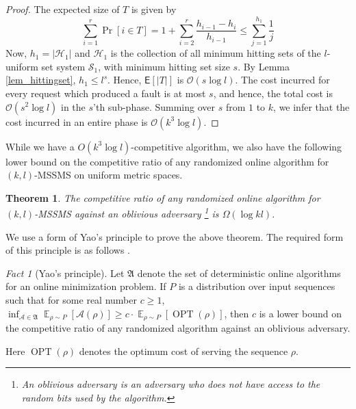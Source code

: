 \documentclass[11pt]{article}
\theoremstyle{plain}\newtheorem{theorem}{Theorem}
\theoremstyle{definition}
\theoremstyle{remark}
\newtheorem{fact}{Fact}
\DeclareMathOperator{\opt}{OPT}
\begin{document}
\begin{proof}
The expected size of $T$ is given by
\[\sum_{i=1}^r\Pr[i\in T]=1+\sum_{i=2}^r\frac{h_{i-1}-h_i}{h_{i-1}}\leq\sum_{j=1}^{h_1}\frac{1}{j}\]
Now, $h_1=|\mathcal{H}_1|$ and $\mathcal{H}_1$ is the collection of all minimum hitting sets of the $l$-uniform set system $\mathcal{S}_1$, with minimum hitting set size $s$. By Lemma \ref{lem_hittingset}, $h_1\leq l^s$. Hence, $\mathsf{E}[|T|]$ is $\mathcal{O}(s\log l)$. The cost incurred for every request which produced a fault is at most $s$, and hence, the total cost is $\mathcal{O}(s^2\log l)$ in the $s$'th sub-phase. Summing over $s$ from $1$ to $k$, we infer that the cost incurred in an entire phase is $\mathcal{O}(k^3\log l)$.
\end{proof}

While we have a $O(k^3\log l)$-competitive algorithm, we also have the following lower bound on the competitive ratio of any randomized online algorithm for $(k,l)$-MSSMS on uniform metric spaces.

\begin{theorem}\label{thm_rand_lb}
The competitive ratio of any randomized online algorithm for $(k,l)$-MSSMS against an oblivious adversary \footnote{An oblivious adversary is an adversary who does not have access to the random bits used by the algorithm.} is $\Omega(\log kl)$.
\end{theorem}

We use a form of Yao's principle \cite{Yao77} to prove the above theorem.
The required form of this principle is as follows \cite{BorodinE99,StougieV02}.

\begin{fact}[Yao's principle]\label{fact_yao}
Let $\mathfrak{A}$ denote the set of deterministic online algorithms for an online minimization problem. If $P$ is a distribution over input sequences such that for some real number $c\geq1$, $\inf_{\mathcal{A}\in\mathfrak{A}}\mathop{\mathbb{E}}_{\rho\sim P}\left[\mathcal{A}(\rho)\right]\geq c\cdot\mathop{\mathbb{E}}_{\rho\sim P}\left[\opt(\rho)\right]$, 
then $c$ is a lower bound on the competitive ratio of any randomized algorithm against an oblivious adversary.
\end{fact}

Here $\opt(\rho)$ denotes the optimum cost of serving the sequence $\rho$.
\end{document}
